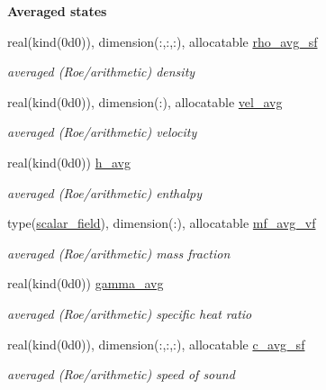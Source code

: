 \begin{Indent}\textbf{ Averaged states}\par
\begin{DoxyCompactItemize}
\item 
real(kind(0d0)), dimension(\+:,\+:,\+:), allocatable \hyperlink{namespacem__variables__conversion_a634c394073f72172798e63327fc4da9f}{rho\+\_\+avg\+\_\+sf}
\begin{DoxyCompactList}\small\item\em averaged (Roe/arithmetic) density \end{DoxyCompactList}\item 
real(kind(0d0)), dimension(\+:), allocatable \hyperlink{namespacem__variables__conversion_a8a9fd6029912bd540f67f414592f52f6}{vel\+\_\+avg}
\begin{DoxyCompactList}\small\item\em averaged (Roe/arithmetic) velocity \end{DoxyCompactList}\item 
real(kind(0d0)) \hyperlink{namespacem__variables__conversion_ac6e02dc63185c34a062b7e8107748479}{h\+\_\+avg}
\begin{DoxyCompactList}\small\item\em averaged (Roe/arithmetic) enthalpy \end{DoxyCompactList}\item 
type(\hyperlink{structm__derived__types_1_1scalar__field}{scalar\+\_\+field}), dimension(\+:), allocatable \hyperlink{namespacem__variables__conversion_a9ca8440ed6e591b63ef1466c6b46ce5d}{mf\+\_\+avg\+\_\+vf}
\begin{DoxyCompactList}\small\item\em averaged (Roe/arithmetic) mass fraction \end{DoxyCompactList}\item 
real(kind(0d0)) \hyperlink{namespacem__variables__conversion_a3f563ef8c3ca1b8af63de2eb093f8fd6}{gamma\+\_\+avg}
\begin{DoxyCompactList}\small\item\em averaged (Roe/arithmetic) specific heat ratio \end{DoxyCompactList}\item 
real(kind(0d0)), dimension(\+:,\+:,\+:), allocatable \hyperlink{namespacem__variables__conversion_a7c36a0df12279321428e742ac7a71001}{c\+\_\+avg\+\_\+sf}
\begin{DoxyCompactList}\small\item\em averaged (Roe/arithmetic) speed of sound \end{DoxyCompactList}\item 

\end{DoxyCompactItemize}
\end{Indent}
